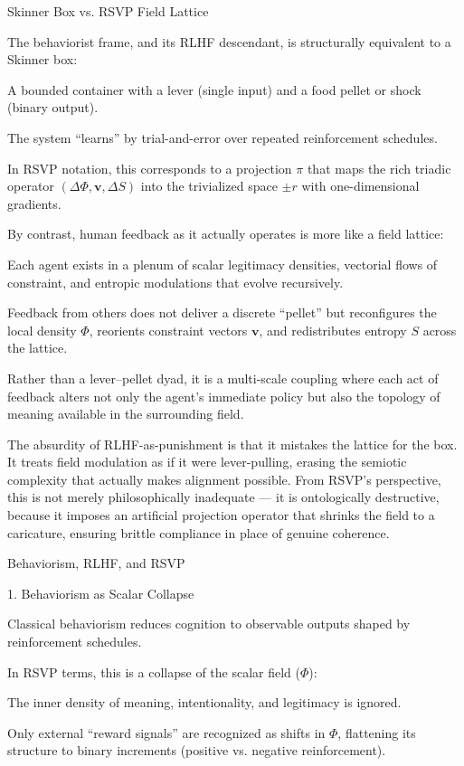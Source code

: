 \documentclass{article}
\begin{document}
Skinner Box vs. RSVP Field Lattice

The behaviorist frame, and its RLHF descendant, is structurally equivalent to a Skinner box:

A bounded container with a lever (single input) and a food pellet or shock (binary output).

The system “learns” by trial-and-error over repeated reinforcement schedules.

In RSVP notation, this corresponds to a projection $\pi$ that maps the rich triadic operator $(\Delta \Phi, \mathbf{v}, \Delta S)$ into the trivialized space ${\pm r}$ with one-dimensional gradients.


By contrast, human feedback as it actually operates is more like a field lattice:

Each agent exists in a plenum of scalar legitimacy densities, vectorial flows of constraint, and entropic modulations that evolve recursively.

Feedback from others does not deliver a discrete “pellet” but reconfigures the local density $\Phi$, reorients constraint vectors $\mathbf{v}$, and redistributes entropy $S$ across the lattice.

Rather than a lever–pellet dyad, it is a multi-scale coupling where each act of feedback alters not only the agent’s immediate policy but also the topology of meaning available in the surrounding field.


The absurdity of RLHF-as-punishment is that it mistakes the lattice for the box. It treats field modulation as if it were lever-pulling, erasing the semiotic complexity that actually makes alignment possible. From RSVP’s perspective, this is not merely philosophically inadequate — it is ontologically destructive, because it imposes an artificial projection operator that shrinks the field to a caricature, ensuring brittle compliance in place of genuine coherence.

Behaviorism, RLHF, and RSVP

1. Behaviorism as Scalar Collapse

Classical behaviorism reduces cognition to observable outputs shaped by reinforcement schedules.

In RSVP terms, this is a collapse of the scalar field ($\Phi$):

The inner density of meaning, intentionality, and legitimacy is ignored.

Only external “reward signals” are recognized as shifts in $\Phi$, flattening its structure to binary increments (positive vs. negative reinforcement).
\end{document}
